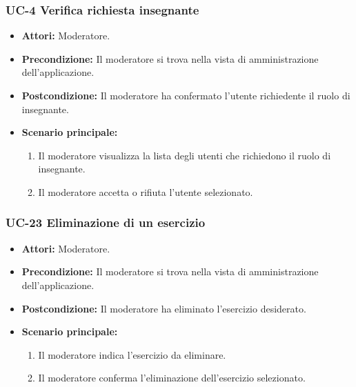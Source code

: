 \subsubsection{UC-4 Verifica richiesta insegnante}
		\begin{itemize}
			\item \textbf{Attori:} Moderatore.
			\item \textbf{Precondizione:} Il moderatore si trova nella vista di amministrazione dell'applicazione.
			\item \textbf{Postcondizione:} Il moderatore ha confermato l'utente richiedente il ruolo di insegnante.
			\item \textbf{Scenario principale:}
				\begin{enumerate}
					\item Il moderatore visualizza la lista degli utenti che richiedono il ruolo di insegnante.
					\item Il moderatore accetta o rifiuta l'utente selezionato.
				\end{enumerate}
		\end{itemize}
		
\subsubsection{UC-23 Eliminazione di un esercizio}
			\begin{itemize}
			\item \textbf{Attori:} Moderatore.
			\item \textbf{Precondizione:} Il moderatore si trova nella vista di amministrazione dell'applicazione.
			\item \textbf{Postcondizione:} Il moderatore ha eliminato l'esercizio desiderato.
			\item \textbf{Scenario principale:}
				\begin{enumerate}
					\item Il moderatore indica l'esercizio da eliminare.
					\item Il moderatore conferma l'eliminazione dell'esercizio selezionato.
				\end{enumerate}
		\end{itemize}

